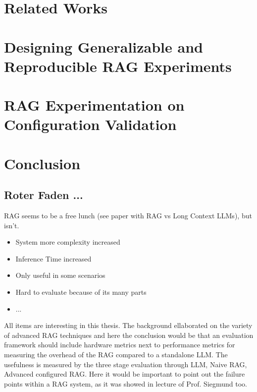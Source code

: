 \documentclass[english,master]{swsLeipzig}
\begin{document}
\chapter{Related Works}\label{chap:relwork}


\chapter{Designing Generalizable and Reproducible RAG Experiments}\label{chap:design}


\chapter{RAG Experimentation on Configuration Validation}\label{chap:Experiment}


\chapter{Conclusion}\label{chap:Conclusion}


\section{Roter Faden ...}
RAG seems to be a free lunch (see paper with RAG vs Long Context LLMs), but isn't. 
\begin{itemize}
  \item System more complexity increased
  \item Inference Time increased
  \item Only useful in some scenarios 
  \item Hard to evaluate because of its many parts
  \item ...
\end{itemize}

All items are interesting in this thesis. The background ellaborated on the variety of advanced RAG techniques and here the conclusion would be that an evaluation framework should include hardware metrics next to performance metrics for measuring the overhead of the RAG compared to a standalone LLM. The usefulness is measured by the three stage evaluation through LLM, Naive RAG, Advanced configured RAG. Here it would be important to point out the failure points within a RAG system, as it was showed in lecture of Prof. Siegmund too. 
\appendix



\end{document}
